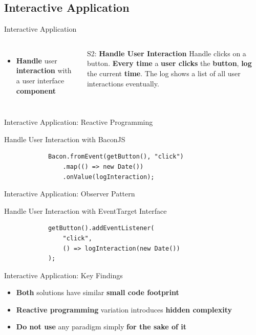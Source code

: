 \documentclass{beamer}
\begin{document}
\subsection*{Interactive Application}
\begin{frame}[t]{Interactive Application}
	\begin{columns}[t]
			\begin{itemize}
				\item \textbf{Handle} user \textbf{interaction} with a user interface \textbf{component}
			\end{itemize}

			\begin{block}{S2: \textbf{Handle User Interaction}}
				Handle clicks on a button. \textbf{Every time} a \textbf{user clicks} the \textbf{button}, \textbf{log} the current \textbf{time}. The log shows a list of all user interactions eventually.
			\end{block}
	\end{columns}
\end{frame}

\begin{frame}[fragile=singleslide]{Interactive Application: Reactive Programming}
	\begin{block}{Handle User Interaction with BaconJS}
		\begin{verbatim}
			Bacon.fromEvent(getButton(), "click")
				.map(() => new Date())
				.onValue(logInteraction);
		\end{verbatim}
	\end{block}
\end{frame}


\begin{frame}[fragile=singleslide]{Interactive Application: Observer Pattern}
	\begin{block}{Handle User Interaction with EventTarget Interface}
		\begin{verbatim}
			getButton().addEventListener(
				"click",
				() => logInteraction(new Date())
			);
		\end{verbatim}
	\end{block}
\end{frame}

\begin{frame}{Interactive Application: Key Findings}
	\begin{itemize}
		\item \textbf{Both} solutions have similar \textbf{small code footprint}\bigskip
		\item \textbf{Reactive programming} variation introduces \textbf{hidden complexity}\bigskip
		\item \textbf{Do not use} any paradigm simply \textbf{for the sake of it}
	\end{itemize}
\end{frame}
\end{document}

